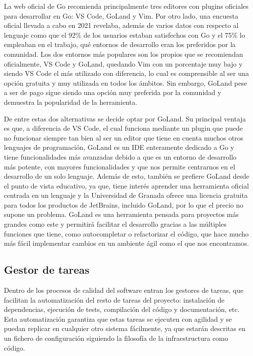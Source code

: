 La web oficial de Go recomienda principalmente tres editores con plugins
oficiales para desarrollar en Go: VS Code, GoLand y Vim. Por otro lado, una
encuesta oficial llevada a cabo en 2021 \cite{go_survey} revelaba, además de
varios datos con respecto al lenguaje como que el 92\% de los usuarios estaban
satisfechos con Go y el 75\% lo empleaban en el trabajo, qué entornos de
desarrollo eran los preferidos por la comunidad. Los dos entornos más populares
son los propios que se recomiendan oficialmente, VS Code y GoLand, quedando Vim
con un porcentaje muy bajo y siendo VS Code el más utilizado con diferencia, lo
cual es comprensible al ser una opción gratuita y muy utilizada en todos los
ámbitos. Sin embargo, GoLand pese a ser de pago sigue siendo una opción muy
preferida por la comunidad y demuestra la popularidad de la herramienta.

De entre estas dos alternativas se decide optar por GoLand. Su principal ventaja
es que, a diferencia de VS Code, el cual funciona mediante un plugin que puede
no funcionar siempre tan bien al ser un editor que tiene en cuenta muchos otros
lenguajes de programación, GoLand es un IDE enteramente dedicado a Go y tiene
funcionalidades más avanzadas debido a que es un entorno de desarrollo más
potente, con mayores funcionalidades y que nos permite centrarnos en el
desarrollo de un solo lenguaje. Además de esto, también se prefiere GoLand desde
el punto de vista educativo, ya que, tiene interés aprender una herramienta
oficial centrada en un lenguaje y la Universidad de Granada ofrece una licencia
gratuita para todos los productos de JetBrains, incluido GoLand, por lo que el
precio no supone un problema. GoLand es una herramienta pensada para proyectos
más grandes como este y permitirá facilitar el desarrollo gracias a las
múltiples funciones que tiene, como autocompletar o refactorizar el código, que
hace mucho más fácil implementar cambios en un ambiente ágil como el que nos
encontramos.

\subsection{Gestor de tareas}
Dentro de los procesos de calidad del software entran los gestores de tareas,
que facilitan la automatización del resto de tareas del proyecto: instalación de
dependencias, ejecución de tests, compilación del código y documentación, etc.
Esta automatización garantiza que estas tareas se ejecuten con agilidad y se
puedan replicar en cualquier otro sistema fácilmente, ya que estarán descritas
en un fichero de configuración siguiendo la filosofía de la infraestructura como
código.

